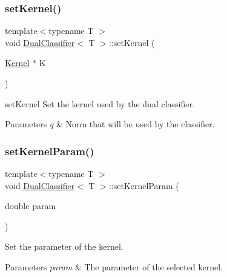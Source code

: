 \subsubsection{\texorpdfstring{set\+Kernel()}{setKernel()}}
{\footnotesize\ttfamily template$<$typename T $>$ \\
void \mbox{\hyperlink{class_dual_classifier}{Dual\+Classifier}}$<$ T $>$\+::set\+Kernel (\begin{DoxyParamCaption}\item[{\mbox{\hyperlink{class_kernel}{Kernel}} $\ast$}]{K }\end{DoxyParamCaption})\hspace{0.3cm}{\ttfamily [inline]}}



set\+Kernel Set the kernel used by the dual classifier. 


\begin{DoxyParams}{Parameters}
{\em q} & Norm that will be used by the classifier. \\
\hline
\end{DoxyParams}
\mbox{\label{class_dual_classifier_a1eaa47dfe556a9c0ecb05cd82324c337}} 
\subsubsection{\texorpdfstring{set\+Kernel\+Param()}{setKernelParam()}}
{\footnotesize\ttfamily template$<$typename T $>$ \\
void \mbox{\hyperlink{class_dual_classifier}{Dual\+Classifier}}$<$ T $>$\+::set\+Kernel\+Param (\begin{DoxyParamCaption}\item[{double}]{param }\end{DoxyParamCaption})\hspace{0.3cm}{\ttfamily [inline]}}



Set the parameter of the kernel. 


\begin{DoxyParams}{Parameters}
{\em param} & The parameter of the selected kernel. \\
\hline
\end{DoxyParams}
\mbox{\label{class_dual_classifier_abe138aa8f388a11475773155961911be}} 
